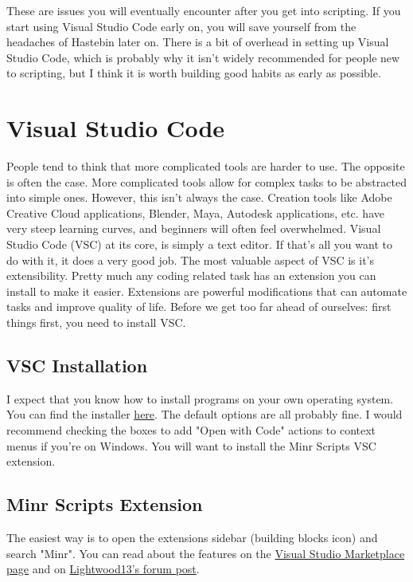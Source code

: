 \documentclass[oneside]{book}
\begin{document}
These are issues you will eventually encounter after you get into scripting. If you start using Visual Studio Code early on, you will save yourself from the headaches of Hastebin later on. There is a bit of overhead in setting up Visual Studio Code, which is probably why it isn't widely recommended for people new to scripting, but I think it is worth building good habits as early as possible.

\section{Visual Studio Code}
People tend to think that more complicated tools are harder to use. The opposite is often the case. More complicated tools allow for complex tasks to be abstracted into simple ones. However, this isn't always the case. Creation tools like Adobe Creative Cloud applications, Blender, Maya, Autodesk applications, etc. have very steep learning curves, and beginners will often feel overwhelmed. Visual Studio Code (VSC) at its core, is simply a text editor. If that's all you want to do with it, it does a very good job. The most valuable aspect of VSC is it's extensibility. Pretty much any coding related task has an extension you can install to make it easier. Extensions are powerful modifications that can automate tasks and improve quality of life. Before we get too far ahead of ourselves: first things first, you need to install VSC.

\subsection{VSC Installation}
I expect that you know how to install programs on your own operating system. You can find the installer \href{https://code.visualstudio.com/Download}{here}. The default options are all probably fine. I would recommend checking the boxes to add "Open with Code" actions to context menus if you're on Windows. You will want to install the Minr Scripts VSC extension.

\subsection{Minr Scripts Extension}
The easiest way is to open the extensions sidebar (building blocks icon) and search "Minr". You can read about the features on the \href{https://marketplace.visualstudio.com/items?itemName=Lightwood13.msc}{Visual Studio Marketplace page} and on \href{https://forums.minr.org/threads/visual-studio-code-extension-for-minr-scripts.6175/}{Lightwood13's forum post}.
\end{document}
